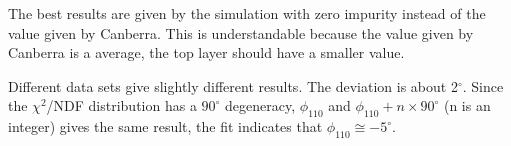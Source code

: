\documentclass[12pt, a4paper]{article}
\begin{document}
The best results are given by the simulation with zero impurity
instead of the value given by Canberra. This is understandable because
the value given by Canberra is a average, the top layer should have a
smaller value.

Different data sets give slightly different results. The deviation is
about 2$^{\circ}$. Since the $\chi^{2}$/NDF distribution has a
$90^{\circ}$ degeneracy, $\phi_{110}$ and $\phi_{110} + n \times
90^{\circ}$ (n is an integer) gives the same result, the fit indicates
that $\phi_{110} \cong -5^{\circ}$.
\end{document}
